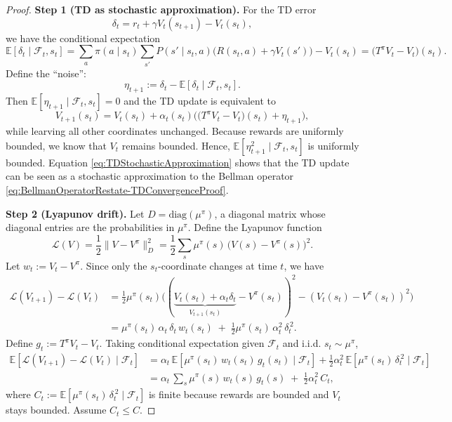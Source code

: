 \documentclass[
]{book}
\theoremstyle{definition}
\theoremstyle{definition}
\theoremstyle{definition}
\theoremstyle{definition}
\theoremstyle{remark}
\begin{document}
\begin{proof}
\textbf{Step 1 (TD as stochastic approximation).} For the TD error
\[
\delta_t=r_{t}+\gamma V_t(s_{t+1})-V_t(s_t),
\]
we have the conditional expectation
\[
\mathbb E[\delta_t\mid \mathcal F_t, s_t]
=\sum_{a}\pi(a\mid s_t)\sum_{s'}P(s'\mid s_t,a)\Big(R(s_t,a)+\gamma V_t(s')\Big)-V_t(s_t)
=\big(T^\pi V_t - V_t\big)(s_t).
\]
Define the ``noise'':
\[
\eta_{t+1}:=\delta_t-\mathbb E[\delta_t\mid \mathcal F_t,s_t].
\]
Then \(\mathbb E[\eta_{t+1}\mid \mathcal F_t,s_t]=0\) and the TD update is equivalent to
\begin{equation}
V_{t+1}(s_t)=V_t(s_t)+\alpha_t(s_t)\Big( \big(T^\pi V_t - V_t\big)(s_t) + \eta_{t+1}\Big),
\label{eq:TDStochasticApproximation}
\end{equation}
while learving all other coordinates unchanged. Because rewards are uniformly bounded, we know that \(V_t\) remains bounded. Hence, \(\mathbb E[\eta_{t+1}^2\mid \mathcal F_t, s_t]\) is uniformly bounded. Equation \eqref{eq:TDStochasticApproximation} shows that the TD update can be seen as a stochastic approximation to the Bellman operator \eqref{eq:BellmanOperatorRestate-TDConvergenceProof}.

\textbf{Step 2 (Lyapunov drift).} Let \(D=\mathrm{diag}(\mu^\pi)\), a diagonal matrix whose diagonal entries are the probabilities in \(\mu^\pi\).
Define the Lyapunov function
\[
\mathcal L(V)=\frac{1}{2} \|V-V^\pi\|_D^2=\frac{1}{2} \sum_s \mu^\pi(s)\,\big(V(s)-V^\pi(s)\big)^2.
\]
Let \(w_t:=V_t - V^\pi\). Since only the \(s_t\)-coordinate changes at time \(t\), we have
\begin{equation}
\begin{split}
\mathcal L(V_{t+1})-\mathcal L(V_t)
&=\frac{1}{2} \mu^\pi(s_t)\Big(( \underbrace{V_t(s_t)+\alpha_t\delta_t}_{V_{t+1}(s_t)} - V^\pi(s_t) )^2 -(V_t(s_t)-V^\pi(s_t))^2\Big)\\
&= \mu^\pi(s_t)\,\alpha_t\,\delta_t\,w_t(s_t)\;+\;\frac{1}{2} \mu^\pi(s_t)\,\alpha_t^2\,\delta_t^{\,2}.
\end{split}
\label{eq:DifferenceBetweenLyapunov}
\end{equation}
Define \(g_t := T^\pi V_t - V_t\). Taking conditional expectation given \(\mathcal F_t\) and i.i.d. \(s_t\sim \mu^\pi\),
\begin{equation}
\begin{split}
\mathbb E\!\left[\mathcal L(V_{t+1})-\mathcal L(V_t)\mid \mathcal F_t\right]
&= \alpha_t\,\mathbb E\!\left[\mu^\pi(s_t)\,w_t(s_t)\,g_t(s_t)\mid \mathcal F_t\right]
+ \frac{1}{2} \alpha_t^2\,\mathbb E\!\left[\mu^\pi(s_t)\,\delta_t^{\,2}\mid \mathcal F_t\right]\\
&= \alpha_t\,\sum_s \mu^\pi(s)\,w_t(s)\,g_t(s) \;+\; \frac{1}{2} \alpha_t^2\,C_t,
\end{split}
\label{eq:DifferenceBetweenLyapunov-ConditionalExpectation}
\end{equation}
where \(C_t:=\mathbb E\!\left[\mu^\pi(s_t)\,\delta_t^{\,2}\mid \mathcal F_t\right]\) is finite because rewards are bounded and \(V_t\) stays bounded. Assume \(C_t \leq C\).


\end{proof}
\end{document}
